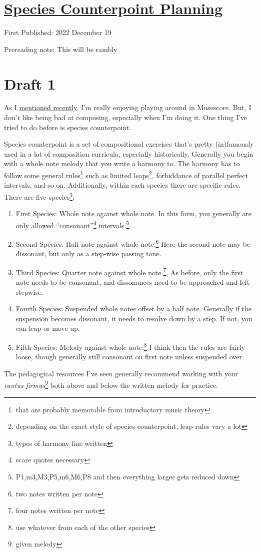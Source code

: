 \documentclass[12pt]{article}[titlepage]
\newcommand{\say}[1]{``#1''}
\newcommand{\1}{\={a}}
\newcommand{\2}{\={e}}
\newcommand{\3}{\={\i}}
\newcommand{\4}{\=o}
\newcommand{\5}{\=u}
\newcommand{\6}{\={A}}
\renewcommand{\,}{\textsuperscript{,}}
\begin{document}
\doublespacing
\section{\href{species-counterpoint-planning.tex}{Species Counterpoint Planning}}
First Published: 2022 December 19

Prereading note: This will be rambly

\section{Draft 1}
As I \href{musescore-4.html}{mentioned recently}, I'm really enjoying playing around in Musescore.
But, I don't like being bad at composing, especially when I'm doing it.
One thing I've tried to do before is species counterpoint.

Species counterpoint is a set of compositional exercises that's pretty (in)famously used in a lot of composition curricula, especially historically.
Generally you begin with a whole note melody that you write a harmony to.
The harmony has to follow some general rules\footnote{that are probably memorable from introductory music theory} such as limited leaps\footnote{depending on the exact style of species counterpoint, leap rules vary a lot}, forbiddance of parallel perfect intervals, and so on.
Additionally, within each species there are specific rules.
There are five species\footnote{types of harmony line written}:
\begin{enumerate}
\item First Species: Whole note against whole note.
In this form, you generally are only allowed \say{consonant}\footnote{scare quotes necessary} intervals.\footnote{P1,m3,M3,P5,m6,M6,P8 and then everything larger gets reduced down}
\item Second Species: Half note against whole note.\footnote{two notes written per note}
Here the second note may be dissonant, but only as a step-wise passing tone.
\item Third Species: Quarter note against whole note.\footnote{four notes written per note}.
As before, only the first note needs to be consonant, and dissonances need to be approached and left stepwise.
\item Fourth Species: Suspended whole notes offset by a half note.
Generally if the suspension becomes dissonant, it needs to resolve down by a step.
If not, you can leap or move up.
\item Fifth Species: Melody against whole note.\footnote{use whatever from each of the other species}
I think then the rules are fairly loose, though generally still consonant on first note unless suspended over.
\end{enumerate}
The pedagogical resources I've seen generally recommend working with your \textit{cantus firmus}\footnote{given melody} both above and below the written melody for practice.
\end{document}
